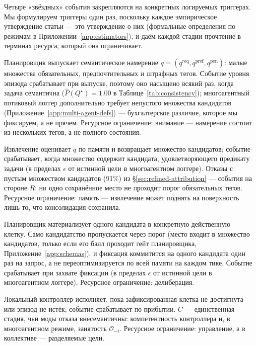 \documentclass{article}
\begin{document}
Четыре «звёздных» события закрепляются на конкретных логируемых триггерах. Мы формулируем триггеры один раз, поскольку каждое эмпирическое утверждение статьи --- это утверждение о них (формальные определения по режимам в Приложении~\ref{app:estimators}), и даём каждой стадии прочтение в терминах ресурса, который она ограничивает.

\begin{description}[leftmargin=10pt,topsep=2pt,itemsep=2pt]
\item[$Q^\star$ (намерение выпущено).] Планировщик выпускает семантическое намерение $q=(q^{\mathrm{req}},q^{\mathrm{pref}},q^{\mathrm{pen}})$: малые множества обязательных, предпочтительных и штрафных тегов. Событие уровня эпизода срабатывает при выпуске, поэтому оно насыщено всякий раз, когда задача семантична ($\hat P(Q^\star){=}1.00$ в Таблице~\ref{tab:consistency}); многоагентный потиковый логгер дополнительно требует непустого множества кандидатов (Приложение~\ref{app:multi-agent-defs}) --- бухгалтерское различие, которое мы фиксируем, а не прячем. Ресурсное ограничение: внимание --- намерение состоит из нескольких тегов, а не полного состояния.
\item[$R^\star$ (память отвечает).] Извлечение оценивает $q$ по памяти и возвращает множество кандидатов; событие срабатывает, когда множество содержит кандидата, удовлетворяющего предикату задачи (в пределах $\epsilon$ от истинной цели в многоагентном логгере). Отказы с пустым множеством кандидатов (91\%) из \S\ref{sec:refined-attribution} --- события на стороне $R$: ни одно сохранённое место не проходит порог обязательных тегов. Ресурсное ограничение: память --- извлечение может поднять на поверхность лишь то, что консолидация сохранила.
\item[$M^\star$ (фиксация цели).] Планировщик материализует одного кандидата в конкретную действенную клетку. Само кандидатство пропускается через порог (место входит в множество кандидатов, только если его балл проходит гейт планировщика, Приложение~\ref{app:schemas}), и фиксация коммитится на одного кандидата один раз на запрос, а не переоптимизируется по всей памяти на каждом тике. Событие срабатывает при захвате фиксации (в пределах $\epsilon$ от истинной цели в многоагентном логгере). Ресурсное ограничение: делиберация.
\item[$C^\star$ (замкнутое завершение).] Локальный контроллер исполняет, пока зафиксированная клетка не достигнута или эпизод не истёк; событие срабатывает по прибытии. $C$ --- единственная стадия, чьи моды отказа внесемантичны: компетентность контроллера и, в многоагентном режиме, занятость $\mathcal{O}_{-i}$. Ресурсное ограничение: управление, а в коллективе --- разделяемые цели.
\end{description}
\end{document}
